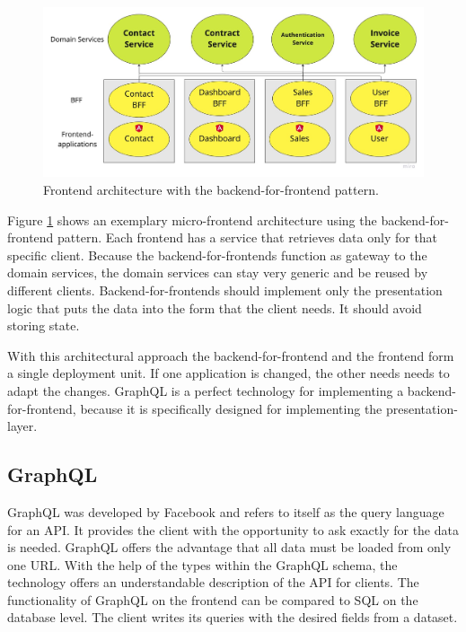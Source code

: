 \ifshowImages
\begin{figure}[H]
\centering
\includegraphics[width=0.8\linewidth]{images/ui-bff-architecture.jpg}
\caption{Frontend architecture with the backend-for-frontend pattern.}\label{figure:state-of-the-art:ui-bff-architecture}
\end{figure}
\fi

Figure \ref{figure:state-of-the-art:ui-bff-architecture} shows an exemplary micro-frontend architecture using the backend-for-frontend pattern. Each frontend has a service that retrieves data only for that specific client. Because the backend-for-frontends function as gateway to the domain services, the domain services can stay very generic and be reused by different clients. Backend-for-frontends should implement only the presentation logic that puts the data into the form that the client needs. It should avoid storing state. \cite{misc:2019:leitner:backend-for-frontends}

With this architectural approach the backend-for-frontend and the frontend form a single deployment unit. If one application is changed, the other needs needs to adapt the changes. GraphQL is a perfect technology for implementing a backend-for-frontend, because it is specifically designed for implementing the presentation-layer.

\subsection{GraphQL}

GraphQL was developed by Facebook and refers to itself as the query language for an API. It provides the client with the opportunity to ask exactly for the data is needed. GraphQL offers the advantage that all data must be loaded from only one URL. With the help of the types within the GraphQL schema, the technology offers an understandable description of the
API for clients. \cite{misc:-:graphql-org} The functionality of GraphQL on the frontend can be compared to SQL on the database level. The client writes its queries with the desired fields from a dataset.

